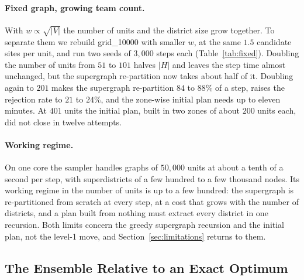 \paragraph{Fixed graph, growing team count.}
With $w \propto \sqrt{|V|}$ the number of units and the district size grow together. To separate them we rebuild grid\_10000 with smaller $w$, at the same $1.5$ candidate sites per unit, and run two seeds of $3{,}000$ steps each (Table~\ref{tab:fixed}). Doubling the number of units from $51$ to $101$ halves $|H|$ and leaves the step time almost unchanged, but the supergraph re-partition now takes about half of it. Doubling again to $201$ makes the supergraph re-partition $84$ to $88\%$ of a step, raises the rejection rate to $21$ to $24\%$, and the zone-wise initial plan needs up to eleven minutes. At $401$ units the initial plan, built in two zones of about $200$ units each, did not close in twelve attempts.

\begin{table}[!htbp]
\centering
\footnotesize\setlength{\tabcolsep}{4pt}

\caption{The $10{,}000$-node grid at a growing number of units $k$, two seeds of $3{,}000$ steps each (one chain of $10{,}000$ steps for $k=51$); ranges are over the seeds. ``Initial plan'' is the time of the zone-wise construction of the first plan.}
\label{tab:fixed}
\end{table}

\paragraph{Working regime.}
On one core the sampler handles graphs of $50{,}000$ units at about a tenth of a second per step, with superdistricts of a few hundred to a few thousand nodes. Its working regime in the number of units is up to a few hundred: the supergraph is re-partitioned from scratch at every step, at a cost that grows with the number of districts, and a plan built from nothing must extract every district in one recursion. Both limits concern the greedy supergraph recursion and the initial plan, not the level-1 move, and Section~\ref{sec:limitations} returns to them.

\subsection{The Ensemble Relative to an Exact Optimum}\label{sec:exp-milp}

